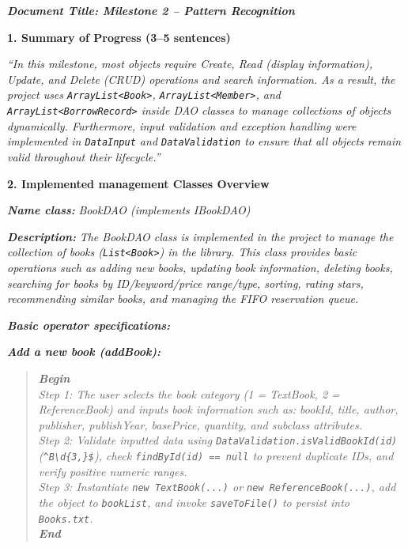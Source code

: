 \documentclass[12pt,a4paper]{article}
\begin{document}
{\itshape\bfseries Document Title: Milestone 2 -- Pattern Recognition\par}

\textbf{1. Summary of Progress (3--5 sentences)}

\textit{``In this milestone, most objects require Create, Read (display information), Update, and Delete (CRUD) operations and search information. As a result, the project uses \texttt{ArrayList<Book>}, \texttt{ArrayList<Member>}, and \texttt{ArrayList<BorrowRecord>} inside DAO classes to manage collections of objects dynamically. Furthermore, input validation and exception handling were implemented in \texttt{DataInput} and \texttt{DataValidation} to ensure that all objects remain valid throughout their lifecycle.''}

\textbf{2. Implemented management Classes Overview}

\hspace{0.5cm}\textbf{\textit{Name class:}} \textit{BookDAO (implements IBookDAO)}

\hspace{0.5cm}\textbf{\textit{Description:}} \textit{The BookDAO class is implemented in the project to manage the collection of books (\texttt{List<Book>}) in the library. This class provides basic operations such as adding new books, updating book information, deleting books, searching for books by ID/keyword/price range/type, sorting, rating stars, recommending similar books, and managing the FIFO reservation queue.}

\hspace{0.5cm}\textbf{\textit{Basic operator specifications:}}

\hspace{0.5cm}\textbf{\textit{Add a new book (addBook):}}
\begin{quote}
\textbf{\textit{Begin}}\\
\hspace*{0.5cm}\textit{Step 1: The user selects the book category (1 = TextBook, 2 = ReferenceBook) and inputs book information such as: bookId, title, author, publisher, publishYear, basePrice, quantity, and subclass attributes.}\\
\hspace*{0.5cm}\textit{Step 2: Validate inputted data using \texttt{DataValidation.isValidBookId(id)} (\texttt{\^{}B\textbackslash d\{3,\}\$}), check \texttt{findById(id) == null} to prevent duplicate IDs, and verify positive numeric ranges.}\\
\hspace*{0.5cm}\textit{Step 3: Instantiate \texttt{new TextBook(...)} or \texttt{new ReferenceBook(...)}, add the object to \texttt{bookList}, and invoke \texttt{saveToFile()} to persist into \texttt{Books.txt}.}\\
\textbf{\textit{End}}
\end{quote}
\end{document}
